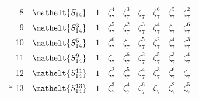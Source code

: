 \documentclass[10pt,a4paper]{article}
\numberwithin{equation}{section}
\newcommand{\eltfont}[1]{{\let\sigma\eltsigma\mathelt{#1}}}
\newcommand{\cls}[1]{\eltfont{#1}}
\newcommand{\rootunity}[1]{\zeta_{#1}}
\begin{document}
{\begin{longtable}{@{}rllllllll@{}}
8 & $\cls{S_{14}}$ & $1$ & $\rootunity{7}^{4}$ & $\rootunity{7}^{3}$ & $\rootunity{7}$ & $\rootunity{7}^{6}$ & $\rootunity{7}^{5}$ & $\rootunity{7}^{2}$\\
9 & $\cls{S_{14}^{3}}$ & $1$ & $\rootunity{7}^{5}$ & $\rootunity{7}^{2}$ & $\rootunity{7}^{3}$ & $\rootunity{7}^{4}$ & $\rootunity{7}$ & $\rootunity{7}^{6}$\\
10 & $\cls{S_{14}^{5}}$ & $1$ & $\rootunity{7}^{6}$ & $\rootunity{7}$ & $\rootunity{7}^{5}$ & $\rootunity{7}^{2}$ & $\rootunity{7}^{4}$ & $\rootunity{7}^{3}$\\
11 & $\cls{S_{14}^{9}}$ & $1$ & $\rootunity{7}$ & $\rootunity{7}^{6}$ & $\rootunity{7}^{2}$ & $\rootunity{7}^{5}$ & $\rootunity{7}^{3}$ & $\rootunity{7}^{4}$\\
12 & $\cls{S_{14}^{11}}$ & $1$ & $\rootunity{7}^{2}$ & $\rootunity{7}^{5}$ & $\rootunity{7}^{4}$ & $\rootunity{7}^{3}$ & $\rootunity{7}^{6}$ & $\rootunity{7}$\\*
13 & $\cls{S_{14}^{13}}$ & $1$ & $\rootunity{7}^{3}$ & $\rootunity{7}^{4}$ & $\rootunity{7}^{6}$ & $\rootunity{7}$ & $\rootunity{7}^{2}$ & $\rootunity{7}^{5}$\\
\bottomrule\end{longtable}}
\end{document}
